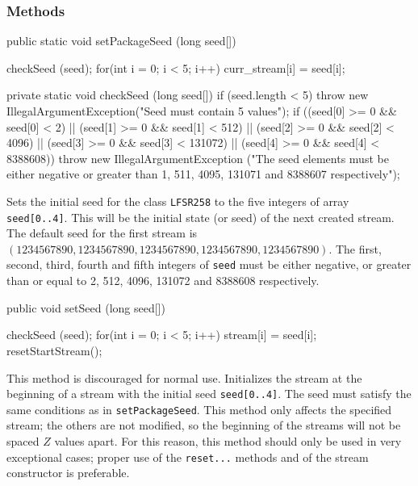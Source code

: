 \subsubsection* {Methods}
\begin{code}
    public static void setPackageSeed (long seed[]) \begin{hide} {
       checkSeed (seed);
       for(int i = 0; i < 5; i++)
          curr_stream[i] = seed[i];
    }

   private static void checkSeed (long seed[]) {
      if (seed.length < 5)
         throw new IllegalArgumentException("Seed must contain 5 values");
      if ((seed[0] >= 0 && seed[0] < 2)  ||
          (seed[1] >= 0 && seed[1] < 512)  ||
          (seed[2] >= 0 && seed[2] < 4096) ||
          (seed[3] >= 0 && seed[3] < 131072) ||
          (seed[4] >= 0 && seed[4] < 8388608))
         throw new IllegalArgumentException
         ("The seed elements must be either negative or greater than 1, 511, 4095, 131071 and 8388607 respectively");
   }\end{hide}
\end{code}
\begin{tabb} Sets the initial seed for the class \texttt{LFSR258} to the five
  integers of array \texttt{seed[0..4]}.
  This will be the initial state (or seed) of the next created stream.
  The default seed for the first stream is $(1234567890, 1234567890,
  1234567890, 1234567890, 1234567890)$.
  The first, second, third, fourth and fifth integers of \texttt{seed}
  must be either negative,
  or greater than or equal to 2, 512, 4096, 131072 and 8388608 respectively.
\end{tabb}
\begin{htmlonly}
\end{htmlonly}
\begin{code}

    public void setSeed (long seed[]) \begin{hide} {
       checkSeed (seed);
       for(int i = 0; i < 5; i++)
           stream[i] = seed[i];
       resetStartStream();
    }\end{hide}
\end{code}
\begin{tabb} This method is discouraged for normal use.
  Initializes the stream at the beginning of a stream with the initial
  seed \texttt{seed[0..4]}. The seed must satisfy the same conditions
  as in \texttt{setPackageSeed}.
  This method only affects the specified stream; the others are not
  modified, so the beginning of the streams will not be
  spaced $Z$ values apart.
  For this reason, this method should only be used in very
  exceptional cases; proper use of the \texttt{reset...} methods
  and of the stream constructor is preferable.
\end{tabb}
